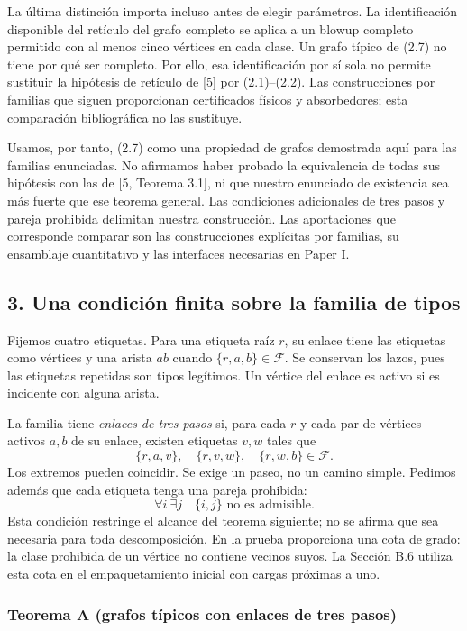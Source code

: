 \documentclass[spanish,11pt,a4paper]{article}
\begin{document}
La última distinción importa incluso antes de elegir parámetros. La identificación disponible del retículo del grafo completo se aplica a un blowup completo permitido con al menos cinco vértices en cada clase. Un grafo típico de (2.7) no tiene por qué ser completo. Por ello, esa identificación por sí sola no permite sustituir la hipótesis de retículo de {[}5{]} por (2.1)--(2.2). Las construcciones por familias que siguen proporcionan certificados físicos y absorbedores; esta comparación bibliográfica no las sustituye.

Usamos, por tanto, (2.7) como una propiedad de grafos demostrada aquí para las familias enunciadas. No afirmamos haber probado la equivalencia de todas sus hipótesis con las de {[}5, Teorema 3.1{]}, ni que nuestro enunciado de existencia sea más fuerte que ese teorema general. Las condiciones adicionales de tres pasos y pareja prohibida delimitan nuestra construcción. Las aportaciones que corresponde comparar son las construcciones explícitas por familias, su ensamblaje cuantitativo y las interfaces necesarias en Paper I.


\subsection{3. Una condición finita sobre la familia de tipos}\label{una-condiciuxf3n-finita-sobre-la-familia-de-tipos}

Fijemos cuatro etiquetas. Para una etiqueta raíz \(r\), su enlace tiene las etiquetas como vértices y una arista \(ab\) cuando \(\{r,a,b\}\in\mathcal F\). Se conservan los lazos, pues las etiquetas repetidas son tipos legítimos. Un vértice del enlace es activo si es incidente con alguna arista.

La familia tiene \emph{enlaces de tres pasos} si, para cada \(r\) y cada par de vértices activos \(a,b\) de su enlace, existen etiquetas \(v,w\) tales que \[\{r,a,v\},\quad\{r,v,w\},\quad\{r,w,b\}\in\mathcal F.
\tag{3.1}\] Los extremos pueden coincidir. Se exige un paseo, no un camino simple. Pedimos además que cada etiqueta tenga una pareja prohibida: \[\forall i\ \exists j\quad\{i,j\}\text{ no es admisible}.
\tag{3.2}\] Esta condición restringe el alcance del teorema siguiente; no se afirma que sea necesaria para toda descomposición. En la prueba proporciona una cota de grado: la clase prohibida de un vértice no contiene vecinos suyos. La Sección B.6 utiliza esta cota en el empaquetamiento inicial con cargas próximas a uno.

\subsubsection{Teorema A (grafos típicos con enlaces de tres pasos)}\label{teorema-a-grafos-tuxedpicos-con-enlaces-de-tres-pasos}
\end{document}
